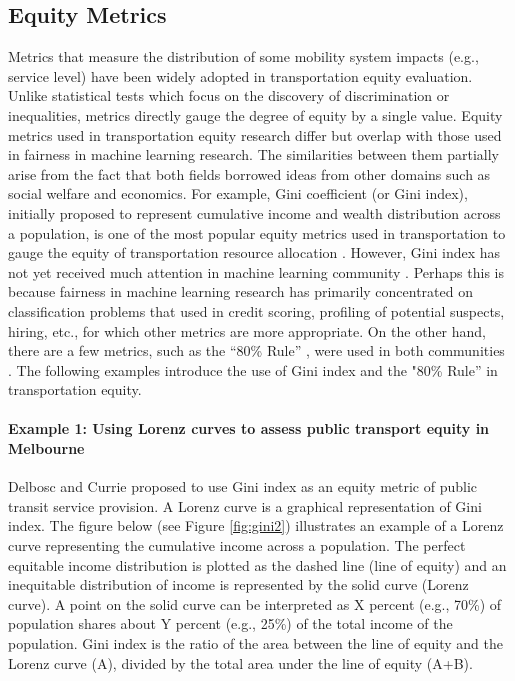 \documentclass[11pt]{article}
\begin{document}
\subsection{Equity Metrics}
Metrics that measure the distribution of some mobility system impacts (e.g., service level) have been widely adopted in transportation equity evaluation. Unlike statistical tests which focus on the discovery of discrimination or inequalities, metrics directly gauge the degree of equity by a single value. Equity metrics used in transportation equity research differ but overlap with those used in fairness in machine learning research. The similarities between them partially arise from the fact that both fields borrowed ideas from other domains such as social welfare and economics. For example, Gini coefficient (or Gini index), initially proposed to represent cumulative income and wealth distribution across a population, is one of the most popular equity metrics used in transportation to gauge the equity of transportation resource allocation \cite{ricciardi2015exploring}.  However, Gini index has not yet received much attention in machine learning community \cite{speicher2018unified}. Perhaps this is because fairness in machine learning research has primarily concentrated on classification problems that used in credit scoring, profiling of potential suspects, hiring, etc., for which other metrics are more appropriate. On the other hand, there are a few metrics, such as the “80\% Rule” \cite{useeoc}, were used in both communities \cite{feldman2015certifying}. The following examples introduce the use of Gini index and the "80\% Rule” in transportation equity. 

\paragraph{Example 1: Using Lorenz curves to assess public transport equity in Melbourne}
Delbosc and Currie \cite{delbosc2011using} proposed to use Gini index as an equity metric of public transit service provision. A Lorenz curve is a graphical representation of Gini index. The figure below (see Figure \ref{fig:gini2}) illustrates an example of a Lorenz curve representing the cumulative income across a population. The perfect equitable income distribution is plotted as the dashed line (line of equity) and an inequitable distribution of income is represented by the solid curve (Lorenz curve). A point on the solid curve can be interpreted as X percent (e.g., 70\%) of population shares about Y percent (e.g., 25\%) of the total income of the population. Gini index is the ratio of the area between the line of equity and the Lorenz curve (A), divided by the total area under the line of equity (A+B). 
\end{document}
